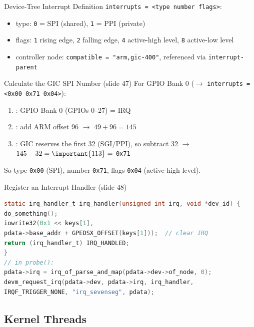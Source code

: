 \begin{definition}{Device-Tree Interrupt Definition}
    \texttt{interrupts = <type number flags>}:
    \begin{itemize}
        \item type: \texttt{0} = SPI (shared), \texttt{1} = PPI (private)
        \item flags: \texttt{1} rising edge, \texttt{2} falling edge,
              \texttt{4} active-high level, \texttt{8} active-low level
        \item controller node: \texttt{compatible = "arm,gic-400"}, referenced via
              \texttt{interrupt-parent}
    \end{itemize}
\end{definition}

\begin{KR}{Calculate the GIC SPI Number (slide 47)}
    For GPIO Bank 0 ($\to$ \texttt{interrupts = <0x00 0x71 0x04>}):
    \begin{enumerate}
        \item {}: GPIO Bank 0 (GPIOs 0--27) = IRQ 
        \item {}: add ARM offset 96 $\to$ $49 + 96 = 145$
        \item {}: GIC reserves the first 32 (SGI/PPI), so
              subtract 32 $\to$ $145 - 32 = \important{113} = $ \texttt{0x71}
    \end{enumerate}
    So type \texttt{0x00} (SPI), number \texttt{0x71}, flags \texttt{0x04} (active-high level).
\end{KR}

\begin{examplecode}{Register an Interrupt Handler (slide 48)}
\begin{lstlisting}[language=C, style=basesmol, aboveskip=2pt, belowskip=2pt]
static irq_handler_t irq_handler(unsigned int irq, void *dev_id) {
do_something();
iowrite32(0x1 << keys[1],
pdata->base_addr + GPEDSX_OFFSET(keys[1]));  // clear IRQ
return (irq_handler_t) IRQ_HANDLED;
}
// in probe():
pdata->irq = irq_of_parse_and_map(pdata->dev->of_node, 0);
devm_request_irq(pdata->dev, pdata->irq, irq_handler,
IRQF_TRIGGER_NONE, "irq_sevenseg", pdata);
\end{lstlisting}
\end{examplecode}

\subsection{Kernel Threads}

